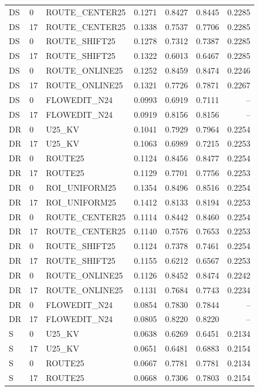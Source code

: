 \begin{longtable}{llp{.29\linewidth}rrrr}
DS & 0 & ROUTE\_CENTER25 & 0.1271 & 0.8427 & 0.8445 & 0.2285 \\
DS & 17 & ROUTE\_CENTER25 & 0.1338 & 0.7537 & 0.7706 & 0.2285 \\
DS & 0 & ROUTE\_SHIFT25 & 0.1278 & 0.7312 & 0.7387 & 0.2285 \\
DS & 17 & ROUTE\_SHIFT25 & 0.1322 & 0.6013 & 0.6467 & 0.2285 \\
DS & 0 & ROUTE\_ONLINE25 & 0.1252 & 0.8459 & 0.8474 & 0.2246 \\
DS & 17 & ROUTE\_ONLINE25 & 0.1321 & 0.7726 & 0.7871 & 0.2267 \\
DS & 0 & FLOWEDIT\_N24 & 0.0993 & 0.6919 & 0.7111 & -- \\
DS & 17 & FLOWEDIT\_N24 & 0.0919 & 0.8156 & 0.8156 & -- \\
DR & 0 & U25\_KV & 0.1041 & 0.7929 & 0.7964 & 0.2254 \\
DR & 17 & U25\_KV & 0.1063 & 0.6989 & 0.7215 & 0.2253 \\
DR & 0 & ROUTE25 & 0.1124 & 0.8456 & 0.8477 & 0.2254 \\
DR & 17 & ROUTE25 & 0.1129 & 0.7701 & 0.7756 & 0.2253 \\
DR & 0 & ROI\_UNIFORM25 & 0.1354 & 0.8496 & 0.8516 & 0.2254 \\
DR & 17 & ROI\_UNIFORM25 & 0.1412 & 0.8133 & 0.8194 & 0.2253 \\
DR & 0 & ROUTE\_CENTER25 & 0.1114 & 0.8442 & 0.8460 & 0.2254 \\
DR & 17 & ROUTE\_CENTER25 & 0.1140 & 0.7576 & 0.7653 & 0.2253 \\
DR & 0 & ROUTE\_SHIFT25 & 0.1124 & 0.7378 & 0.7461 & 0.2254 \\
DR & 17 & ROUTE\_SHIFT25 & 0.1155 & 0.6212 & 0.6567 & 0.2253 \\
DR & 0 & ROUTE\_ONLINE25 & 0.1126 & 0.8452 & 0.8474 & 0.2242 \\
DR & 17 & ROUTE\_ONLINE25 & 0.1131 & 0.7684 & 0.7743 & 0.2234 \\
DR & 0 & FLOWEDIT\_N24 & 0.0854 & 0.7830 & 0.7844 & -- \\
DR & 17 & FLOWEDIT\_N24 & 0.0805 & 0.8220 & 0.8220 & -- \\
S & 0 & U25\_KV & 0.0638 & 0.6269 & 0.6451 & 0.2134 \\
S & 17 & U25\_KV & 0.0651 & 0.6481 & 0.6883 & 0.2154 \\
S & 0 & ROUTE25 & 0.0667 & 0.7781 & 0.7781 & 0.2134 \\
S & 17 & ROUTE25 & 0.0668 & 0.7306 & 0.7803 & 0.2154 \\

\end{longtable}
